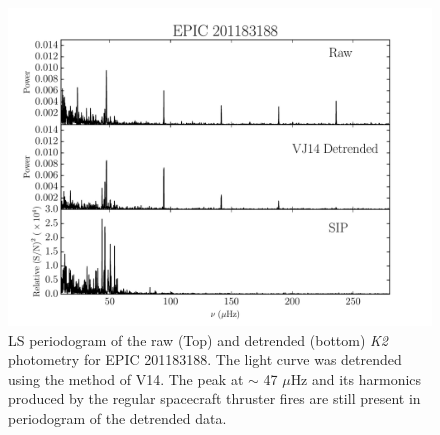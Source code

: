 \documentclass[useAMS, usenatbib, preprint, 12pt]{aastex}
\begin{document}
\begin{figure}
\begin{center}
\includegraphics[width=6in, clip=true]{rawvbg_201183188.pdf}
\caption{LS periodogram of the raw (Top) and detrended
	 (bottom) {\it K2} photometry for EPIC 201183188. The light curve was
 	 detrended using the method of V14. The peak at
	 $\sim$ 47 $\mu$Hz and its harmonics produced by the regular spacecraft
	 thruster fires are still present in periodogram of the detrended
	 data.}
\label{fig:raw}
\end{center}
\end{figure}
\end{document}
